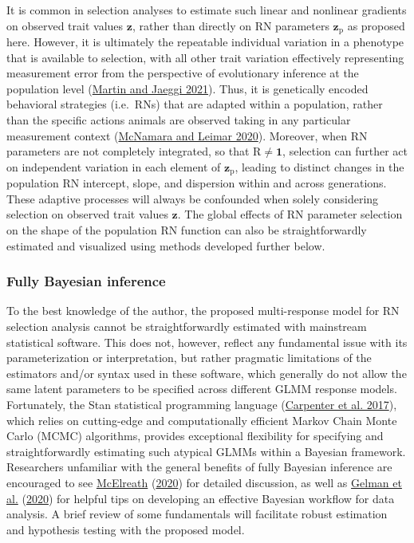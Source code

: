 \documentclass{article}
\begin{document}
It is common in selection analyses to estimate such linear and nonlinear
gradients on observed trait values \(\boldsymbol{z}\), rather than
directly on RN parameters \(\boldsymbol{z}_{\boldsymbol{\mathrm{p}}}\)
as proposed here. However, it is ultimately the repeatable individual
variation in a phenotype that is available to selection, with all other
trait variation effectively representing measurement error from the
perspective of evolutionary inference at the population level
(\protect\hyperlink{ref-Martin2021}{Martin and Jaeggi 2021}). Thus, it
is genetically encoded behavioral strategies (i.e.~RNs) that are adapted
within a population, rather than the specific actions animals are
observed taking in any particular measurement context
(\protect\hyperlink{ref-McNamara2020}{McNamara and Leimar 2020}).
Moreover, when RN parameters are not completely integrated, so that
\(\boldsymbol{\mathrm{R}} \neq \boldsymbol{1}\), selection can further
act on independent variation in each element of
\(\boldsymbol{z}_{\boldsymbol{\mathrm{p}}}\), leading to distinct
changes in the population RN intercept, slope, and dispersion within and
across generations. These adaptive processes will always be confounded
when solely considering selection on observed trait values
\(\boldsymbol{z}\). The global effects of RN parameter selection on the
shape of the population RN function can also be straightforwardly
estimated and visualized using methods developed further below.

\hypertarget{fully-bayesian-inference}{%
\subsubsection{Fully Bayesian
inference}\label{fully-bayesian-inference}}

To the best knowledge of the author, the proposed multi-response model
for RN selection analysis cannot be straightforwardly estimated with
mainstream statistical software. This does not, however, reflect any
fundamental issue with its parameterization or interpretation, but
rather pragmatic limitations of the estimators and/or syntax used in
these software, which generally do not allow the same latent parameters
to be specified across different GLMM response models. Fortunately, the
Stan statistical programming language
(\protect\hyperlink{ref-Stan}{Carpenter et al. 2017}), which relies on
cutting-edge and computationally efficient Markov Chain Monte Carlo
(MCMC) algorithms, provides exceptional flexibility for specifying and
straightforwardly estimating such atypical GLMMs within a Bayesian
framework. Researchers unfamiliar with the general benefits of fully
Bayesian inference are encouraged to see
\protect\hyperlink{ref-Rethinking}{McElreath}
(\protect\hyperlink{ref-Rethinking}{2020}) for detailed discussion, as
well as \protect\hyperlink{ref-Gelman2020}{Gelman et al.}
(\protect\hyperlink{ref-Gelman2020}{2020}) for helpful tips on
developing an effective Bayesian workflow for data analysis. A brief
review of some fundamentals will facilitate robust estimation and
hypothesis testing with the proposed model.
\end{document}
